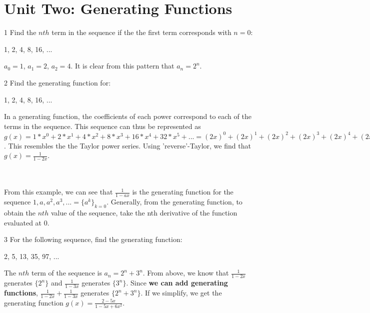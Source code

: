 \section{Unit Two: Generating Functions}
\begin{problem}
    1 Find the $nth$ term in the sequence if the the first term corresponds with $n=0$:
     \begin{center} 1, 2, 4, 8, 16, ...\end{center}
      \end{problem}
\begin{solution}
$a_{0} = 1$, $a_{1} = 2$, $a_{2} = 4$. It is clear from this pattern that $a_{n} = 2^{n}$. 
\end{solution}

\begin{problem}
    2 Find the generating function for:
     \begin{center} 1, 2, 4, 8, 16, ...\end{center}
\end{problem}
\begin{solution}
In a generating function, the coefficients of each power correspond to each of the terms in the sequence. This sequence can thus be represented as $g(x) = 1*x^{0} + 2*x^{1} + 4*x^{2} + 8*x^{3} + 16*x^{4} + 32*x^{5} + ... = (2x)^0 + (2x)^1 + (2x)^2 + (2x)^3 + (2x)^4 + (2x)^5 + ...$. This resembles the the Taylor power series. Using 'reverse'-Taylor, we find that $g(x) = \frac{1}{1-2x}$. 
\end{solution} \\
 

\\From this example, we can see that $\frac{1}{1-ax}$ is the generating function for the sequence $1, a, a^2, a^3, ... = \{a^k\}_{k=0}$. Generally, from the generating function, to obtain the $nth$ value of the sequence, take the nth derivative of the function evaluated at 0.\newline

\begin{problem}
    3 For the following sequence, find the generating function:
    \begin{center} 2, 5, 13, 35, 97, ... \end{center}
\end{problem}

\begin{solution}
The $nth$ term of the sequence is $a_{n} = 2^{n} + 3^{n}$. From above, we know that $\frac{1}{1-2x}$ generates $\{2^n\}$ and $\frac{1}{1-3x}$ generates $\{3^n\}$. Since \textbf{we can add generating functions}, $\frac{1}{1-2x}+\frac{1}{1-3x}$ generates $\{2^n +3^n\}$. If we simplify, we get the generating function $g(x)=\frac{2-5x}{1-5x+6x^2}$.
\end{solution}

